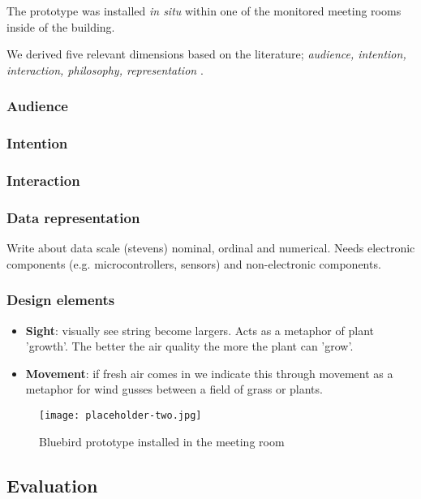The prototype was installed \textit{in situ} within one of the monitored meeting rooms inside of the building.

We derived five relevant dimensions based on the literature; \textit{audience, intention, interaction, philosophy, representation} \cite{sauve_physecology_2022, hornecker_design_2023}.

\subsubsection{Audience}

\subsubsection{Intention}

\subsubsection{Interaction}

\subsubsection{Data representation}

Write about data scale (stevens) nominal, ordinal and numerical. Needs electronic components (e.g. microcontrollers, sensors) and non-electronic components.

\subsubsection{Design elements}

\begin{itemize}
  \item \textbf{Sight}: visually see string become largers. Acts as a metaphor of plant 'growth'. The better the air quality the more the plant can 'grow'.
  \item \textbf{Movement}: if fresh air comes in we indicate this through movement as a metaphor for wind gusses between a field of grass or plants.
\end{itemize}

\begin{figure}[H]
    \centering
    \texttt{[image: placeholder-two.jpg]}
    \caption{Bluebird prototype installed in the meeting room}
    \label{fig:complexity}
\end{figure}

\subsection{Evaluation}
\label{sec:evaluation_results}

